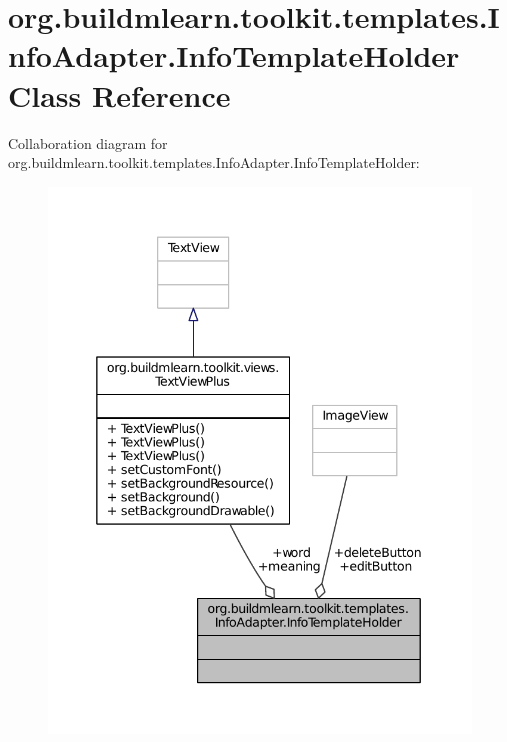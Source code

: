 \hypertarget{classorg_1_1buildmlearn_1_1toolkit_1_1templates_1_1InfoAdapter_1_1InfoTemplateHolder}{\section{org.\-buildmlearn.\-toolkit.\-templates.\-Info\-Adapter.\-Info\-Template\-Holder Class Reference}
\label{classorg_1_1buildmlearn_1_1toolkit_1_1templates_1_1InfoAdapter_1_1InfoTemplateHolder}
}


Collaboration diagram for org.\-buildmlearn.\-toolkit.\-templates.\-Info\-Adapter.\-Info\-Template\-Holder\-:
\nopagebreak
\begin{figure}[H]
\begin{center}
\leavevmode
\includegraphics[width=341pt]{df/d15/classorg_1_1buildmlearn_1_1toolkit_1_1templates_1_1InfoAdapter_1_1InfoTemplateHolder__coll__graph}
\end{center}
\end{figure}
